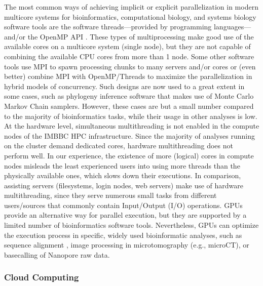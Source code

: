   The most common ways of achieving implicit or explicit parallelization in modern multicore systems for bioinformatics, computational biology, and systems biology software tools are the software threads—provided by programming languages—and/or the OpenMP API \citep{dagum1998openmp}. 
   These types of multiprocessing make good use of the available cores on a multicore system (single node), but they are not capable of combining the available CPU cores from more than 1 node. 
   Some other software tools use MPI to spawn processing chunks to many servers and/or cores or (even better) combine MPI with OpenMP/Threads to maximize the parallelization in hybrid models of concurrency. 
   Such designs are now used to a great extent in some cases, such as phylogeny inference software that makes use of Monte Carlo Markov Chain samplers.
   However, these cases are but a small number compared to the majority of bioinformatics tasks, while their usage in other analyses is low. At the hardware level, simultaneous multithreading is not enabled in the compute nodes of the IMBBC HPC infrastructure. 
   Since the majority of analyses running on the cluster demand dedicated cores, hardware multithreading does not perform well. 
   In our experience, the existence of more (logical) cores in compute nodes misleads the least experienced users into using more threads than the physically available ones, which slows down their executions. 
   In comparison, assisting servers (filesystems, login nodes, web servers) make use of hardware multithreading, since they serve numerous small tasks from different users/sources that commonly contain Input/Output (I/O) operations. 
   GPUs provide an alternative way for parallel execution, but they are supported by a limited number of bioinformatics software tools. Nevertheless, GPUs can optimize the execution process in specific, widely used bioinformatic analyses, such as sequence alignment \cite{vouzis2011gpu, nobile2017graphics}, image processing in microtomography (e.g., microCT), or basecalling of Nanopore raw data.



   \subsubsection*{Cloud Computing}

